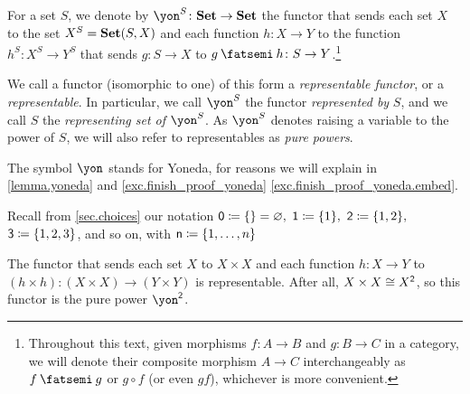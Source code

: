 \documentclass[Book-Poly]{subfiles}
\begin{document}
\begin{definition} \label{def.representable}
    For a set $S$, we denote by $\yon^S\colon\smset\to\smset$ the functor that sends each set $X$ to the set $X^S=\mathbf{Set}(S,X)$ and each function $h\colon X\to Y$ to the function $h^S\colon X^S\to Y^S$ that sends $g\colon S\to X$ to $g\then h\colon S\to Y$.\footnote{Throughout this text, given morphisms $f \colon A \to B$ and $g \colon B \to C$ in a category, we will denote their composite morphism $A \to C$ interchangeably as $f \then g$ or $g \circ f$ (or even $gf$), whichever is more convenient.}

    We call a functor (isomorphic to one) of this form a \emph{representable functor}, or a \emph{representable}.
    In particular, we call $\yon^S$ the functor \emph{represented by} $S$, and we call $S$ the \emph{representing set of $\yon^S$}.
    As $\yon^S$ denotes raising a variable to the power of $S$, we will also refer to representables as \emph{pure powers}.%
\end{definition}

The symbol $\yon$ stands for Yoneda, for reasons we will explain in \cref{lemma.yoneda} and \cref{exc.finish_proof_yoneda} \cref{exc.finish_proof_yoneda.embed}.

Recall from \cref{sec.choices} our notation $\textsf{0}\coloneqq\{\}=\varnothing,$ $\textsf{1}\coloneqq\{1\},$ $\textsf{2}\coloneqq\{1,2\},$ $\textsf{3}\coloneqq\{1,2,3\}$, and so on, with $\mathsf{n}\coloneqq\{1,\ldots,n\}$
\begin{example}
    The functor that sends each set $X$ to $X\times X$ and each function $h\colon X\to Y$ to $(h\times h)\colon (X\times X)\to(Y\times Y)$ is representable.
    After all, $X\times X \cong X^{\textsf{2}}$, so this functor is the pure power $\yon^\2$.
\end{example}
\end{document}
